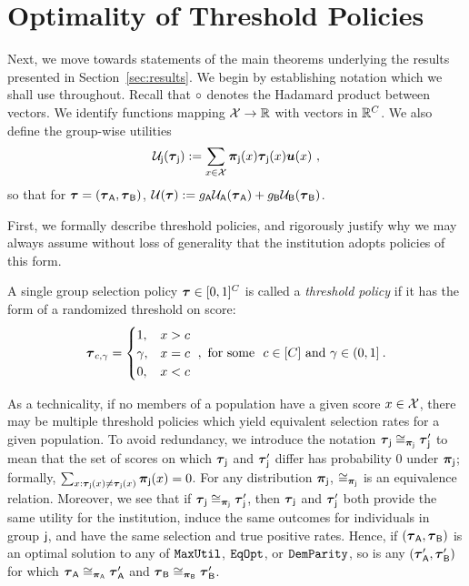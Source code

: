 \section{Optimality of Threshold Policies}\label{section:opt_threshold}
Next, we move towards statements of the main theorems underlying the results presented in Section~\ref{sec:results}.
	We begin by establishing notation which we shall use throughout. Recall that $\circ$ denotes the Hadamard product between vectors.  We identify functions mapping $\mathcal{X} \to \mathbb{R}$ with vectors in $\mathbb{R}^{C}$. We also define the group-wise utilities 
	\begin{eqnarray}
	\mathcal{U}_{\mathsf{j}}(\boldsymbol{\tau}_{\mathsf{j}}) := \sum_{x \in \mathcal{X}}\boldsymbol{\pi}_{\mathsf{j}}(x) \boldsymbol{\tau}_{\mathsf{j}}(x)\boldsymbol{u}(x)~,
	\end{eqnarray}
	so that for $\boldsymbol{\tau} = (\boldsymbol{\tau}_{\mathsf{A}},\boldsymbol{\tau}_{\mathsf{B}})$, $\mathcal{U}(\boldsymbol{\tau}):= g_{\mathsf{A}} \mathcal{U}_{\mathsf{A}}(\boldsymbol{\tau}_{\mathsf{A}}) + g_{\mathsf{B}}\mathcal{U}_{\mathsf{B}}(\boldsymbol{\tau}_{\mathsf{B}})$.


	
 	First, we formally describe threshold policies, and rigorously justify why we may always assume without loss of generality that the institution adopts policies of this form.
	\begin{defn} \label{def:monotone_pols}
		A single group selection policy $\boldsymbol{\tau} \in [0,1]^C$ is called a \emph{threshold policy} if it has the form of a randomized threshold on score:
		\begin{align} \boldsymbol{\tau}_{c,\gamma}= \begin{cases}
		1, & x > c \\
		\gamma, & x=c \\
		0, & x < c
		\end{cases} ~, \text{ for some }~c \in [C]~\text{and}~ \gamma \in (0,1] \:.
		\end{align} 
	\end{defn}


	As a technicality, if no members of a population have a given score $x \in \mathcal{X}$, there may be multiple threshold policies which yield equivalent selection rates for a given population. 
	To avoid redundancy, we introduce the notation $\boldsymbol{\tau}_{\mathsf{j}} \cong_{\boldsymbol{\pi}_{\mathsf{j}}} \boldsymbol{\tau}_{\mathsf{j}}'$ to mean that the set of scores on which $\boldsymbol{\tau}_{\mathsf{j}}$ and $\boldsymbol{\tau}_{\mathsf{j}}'$ differ has probability $0$ under $\boldsymbol{\pi}_{\mathsf{j}}$; 
	formally, $\sum_{x:\boldsymbol{\tau}_{\mathsf{j}}(x) \ne \boldsymbol{\tau}_{\mathsf{j}}(x)} \boldsymbol{\pi}_{\mathsf{j}}(x) = 0$. 
	For any distribution $\boldsymbol{\pi}_{\mathsf{j}}$, $\cong_{\boldsymbol{\pi}_{\mathsf{j}}}$ is an equivalence relation. 
	Moreover, we see that if $\boldsymbol{\tau}_{\mathsf{j}}\cong_{\boldsymbol{\pi}_{\mathsf{j}}} \boldsymbol{\tau}_{\mathsf{j}}'$, 
	then $\boldsymbol{\tau}_{\mathsf{j}}$ and $\boldsymbol{\tau}_{\mathsf{j}}'$ both provide the same utility for the institution, 
	induce the same outcomes for individuals in group $\mathsf{j}$, and
	have the same selection and true positive rates. 
	Hence, if $(\boldsymbol{\tau}_{\mathsf{A}},\boldsymbol{\tau}_{\mathsf{B}})$ is an optimal solution to any of $\mathtt{MaxUtil}$, $\mathtt{EqOpt}$, or $\mathtt{DemParity}$, so is any $(\boldsymbol{\tau}_{\mathsf{A}}',\boldsymbol{\tau}_{\mathsf{B}}')$ for which $\boldsymbol{\tau}_{\mathsf{A}} \cong_{\boldsymbol{\pi}_{\mathsf{A}}} \boldsymbol{\tau}_{\mathsf{A}}'$ and $\boldsymbol{\tau}_{\mathsf{B}} \cong_{\boldsymbol{\pi}_{\mathsf{B}}} \boldsymbol{\tau}_{\mathsf{B}}'$.  

